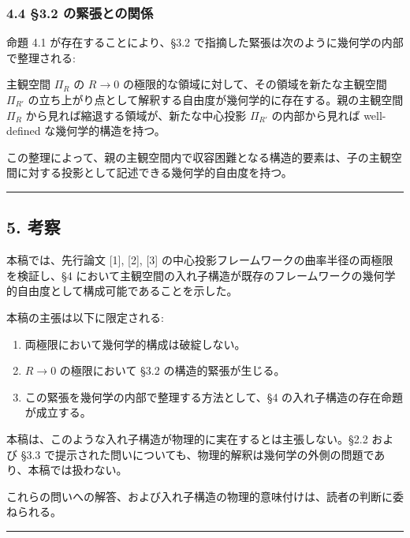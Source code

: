\documentclass[a4paper,11pt]{ltjsarticle}
\theoremstyle{definition}
\providecommand{\tightlist}{\setlength{\itemsep}{0pt}\setlength{\parskip}{0pt}}
\begin{document}
\subsubsection{4.4 §3.2 の緊張との関係}\label{ux306eux7dcaux5f35ux3068ux306eux95a2ux4fc2}

命題 4.1 が存在することにより、§3.2 で指摘した緊張は次のように幾何学の内部で整理される:

主観空間 \(\Pi_R\) の \(R \to 0\) の極限的な領域に対して、その領域を新たな主観空間 \(\Pi_{R'}\) の立ち上がり点として解釈する自由度が幾何学的に存在する。親の主観空間 \(\Pi_R\) から見れば縮退する領域が、新たな中心投影 \(\Pi_{R'}\) の内部から見れば well-defined な幾何学的構造を持つ。

この整理によって、親の主観空間内で収容困難となる構造的要素は、子の主観空間に対する投影として記述できる幾何学的自由度を持つ。

\begin{center}\rule{0.5\linewidth}{0.5pt}\end{center}

\subsection{5. 考察}\label{ux8003ux5bdf}

本稿では、先行論文 {[}1{]}, {[}2{]}, {[}3{]} の中心投影フレームワークの曲率半径の両極限を検証し、§4 において主観空間の入れ子構造が既存のフレームワークの幾何学的自由度として構成可能であることを示した。

本稿の主張は以下に限定される:

\begin{enumerate}
\def\labelenumi{\arabic{enumi}.}
\tightlist
\item
  両極限において幾何学的構成は破綻しない。
\item
  \(R \to 0\) の極限において §3.2 の構造的緊張が生じる。
\item
  この緊張を幾何学の内部で整理する方法として、§4 の入れ子構造の存在命題が成立する。
\end{enumerate}

本稿は、このような入れ子構造が物理的に実在するとは主張しない。§2.2 および §3.3 で提示された問いについても、物理的解釈は幾何学の外側の問題であり、本稿では扱わない。

これらの問いへの解答、および入れ子構造の物理的意味付けは、読者の判断に委ねられる。

\begin{center}\rule{0.5\linewidth}{0.5pt}\end{center}
\end{document}
